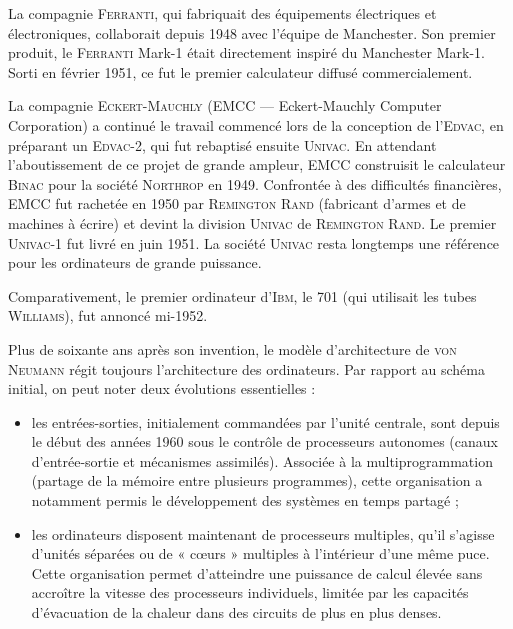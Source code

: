 
La compagnie \textsc{Ferranti}, qui fabriquait des équipements électriques et électroniques, collaborait depuis 1948 avec l’équipe de Manchester. Son premier produit, le \textsc{Ferranti} Mark-1 était directement inspiré du Manchester Mark-1. Sorti en février 1951, ce fut le premier calculateur diffusé commercialement.

La compagnie \textsc{Eckert-Mauchly} (EMCC --- Eckert-Mauchly Computer Corporation) a continué le travail commencé lors de la conception de l’\textsc{Edvac}, en préparant un \textsc{Edvac-2}, qui fut rebaptisé ensuite \textsc{Univac}. En attendant l’aboutissement de ce projet de grande ampleur, EMCC construisit le calculateur \textsc{Binac} pour la société \textsc{Northrop} en 1949. Con\-frontée à des difficultés financières, EMCC fut rachetée en 1950 par \textsc{Remington Rand} (fabricant d’armes et de machines à écrire) et devint la division \textsc{Univac} de \textsc{Remington Rand}. Le premier \textsc{Univac-1} fut livré en juin 1951. La société \textsc{Univac} resta longtemps une référence pour les ordinateurs de grande puissance.

Comparativement, le premier ordinateur d’\textsc{Ibm}, le 701 (qui utilisait les tubes \textsc{Williams}), fut annoncé mi-1952.


Plus de soixante ans après son invention, le modèle d’architecture de \textsc{von Neumann} régit toujours l’architecture des ordinateurs. Par rapport au schéma initial, on peut noter deux évolutions essentielles :
\begin{itemize}
\item les entrées-sorties, initialement commandées par l’unité centra\-le, sont depuis le début des années 1960 sous le contrôle de processeurs autonomes (canaux d’entrée-sortie et mécanismes assimilés). Associée à la multiprogrammation (partage de la mémoire entre plusieurs programmes), cette organisation a notamment permis le développement des systèmes en temps partagé ;
\item les ordinateurs disposent maintenant de processeurs multiples, qu’il s’agisse d’unités séparées ou de « cœurs » multiples à l’intérieur d’une même puce. Cette organisation permet d’atteindre une puissance de calcul élevée sans accroître la vitesse des processeurs individuels, limitée par les capacités d’évacuation de la chaleur dans des circuits de plus en plus denses.
\end{itemize}


